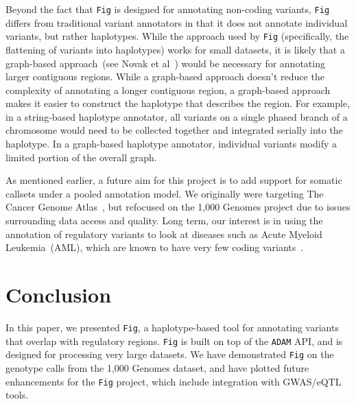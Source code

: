 \documentclass[11pt]{article}
\theoremstyle{plain}
\begin{document}
Beyond the fact that \texttt{Fig} is designed for annotating non-coding variants,
\texttt{Fig} differs from traditional variant annotators in that it does not annotate
individual variants, but rather haplotypes. While the approach used by \texttt{Fig}
(specifically, the flattening of variants into haplotypes) works for small datasets,
it is likely that a graph-based approach~(see Novak et al~\cite{novak15}) would be
necessary for annotating larger contiguous regions. While a graph-based approach
doesn't reduce the complexity of annotating a longer contiguous region, a graph-based
approach makes it easier to construct the haplotype that describes the region. For
example, in a string-based haplotype annotator, all variants on a single phased
branch of a chromosome would need to be collected together and integrated serially
into the haplotype. In a graph-based haplotype annotator, individual variants modify
a limited portion of the overall graph.

As mentioned earlier, a future aim for this project is to add support for somatic
callsets under a pooled annotation model. We originally were targeting The Cancer
Genome Atlas~\cite{weinstein13}, but refocused on the 1,000 Genomes project due to
issues surrounding data access and quality. Long term, our interest is in using the
annotation of regulatory variants to look at diseases such as Acute Myeloid Leukemia~(AML),
which are known to have very few coding variants~\cite{cancer13}.

\section{Conclusion}
\label{sec:conclusion}

In this paper, we presented \texttt{Fig}, a haplotype-based tool for annotating
variants that overlap with regulatory regions. \texttt{Fig} is built on top of the
\texttt{ADAM} API, and is designed for processing very large datasets. We have
demonstrated \texttt{Fig} on the genotype calls from the 1,000 Genomes dataset,
and have plotted future enhancements for the \texttt{Fig} project, which include
integration with GWAS/eQTL tools.



\end{document}
